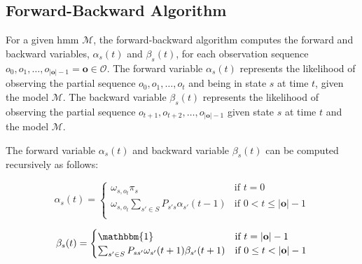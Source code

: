 \subsection{Forward-Backward Algorithm}\label{subsec:forward-backwards_algorithm}
For a given \gls{hmm} $\mathcal{M}$, the forward-backward algorithm computes the forward and backward variables, $\alpha_s(t)$ and $\beta_s(t)$, for each observation sequence $o_0, o_1, \dots, o_{|\mathbf{o}|-1} = \mathbf{o} \in \mathcal{O}$.
The forward variable $\alpha_s(t)$ represents the likelihood of observing the partial sequence $o_0, o_1, \dots, o_t$ and being in state $s$ at time $t$, given the model $\mathcal{M}$.
The backward variable $\beta_s(t)$ represents the likelihood of observing the partial sequence $o_{t+1}, o_{t+2}, \dots, o_{|\mathbf{o}|-1}$ given state $s$ at time $t$ and the model $\mathcal{M}$.





The forward variable $\alpha_s(t)$ and backward variable $\beta_s(t)$ can be computed recursively as follows:

\begin{equation}
    \alpha_s(t) =
    \begin{cases}
        \omega_{s, o_t} \pi_s & \text{if } t = 0 \\
        \omega_{s, o_t} \sum_{s' \in S} P_{s's}\alpha_{s'}(t - 1) & \text{if } 0 < t \leq |\mathbf{o}| - 1 \\
    \end{cases}
    \label{eq:forward-recursive}
\end{equation}


\begin{equation}
    \beta_s(t) =
    \begin{cases}
        \mathbbm{1} & \text{if } t = |\mathbf{o}| - 1 \\
        \sum_{s' \in S} P_{ss'} \omega_{s'}(t + 1) \beta_{s'}(t + 1) & \text{if } 0 \leq t < |\mathbf{o}| - 1 \\
    \end{cases}
    \label{eq:backward-recursive}
\end{equation}


